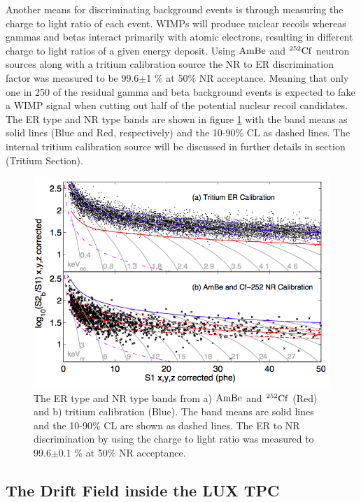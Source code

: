 Another means for discriminating background events is through measuring the charge to light ratio of each event. WIMPs will produce nuclear recoils whereas gammas and betas interact primarily with atomic electrons, resulting in different charge to light ratios of a given energy deposit. Using $\rm AmBe$ and $\rm ^{252}Cf$ neutron sources along with a tritium calibration source the NR to ER discrimination factor was measured to be 99.6$\pm$1 \% at 50\% NR acceptance. Meaning that only one in 250 of the residual gamma and beta background events is expected to fake a WIMP signal when cutting out half of the potential nuclear recoil candidates. The ER type and NR type bands are shown in figure \ref{fig:LUX_ER_NR_Band} with the band means as solid lines (Blue and Red, respectively) and the 10-90\% CL as dashed lines. The internal tritium calibration source will be discussed in further details in section (Tritium Section).

 \begin{figure}[h!]\centering
\includegraphics[scale=.5]{Chapter_LUX_Det/ER_NR_Band_Cal.png}
\caption{The ER type and NR type bands from a) $\rm AmBe$ and $\rm ^{252}Cf$ (Red)  and b) tritium calibration (Blue). The band means are solid lines and the 10-90\% CL are shown as dashed lines. The ER to NR discrimination by using the charge to light ratio was measured to 99.6$\pm$0.1 \% at 50\% NR acceptance.}
\label{fig:LUX_ER_NR_Band}
\end{figure}

\newpage

\subsection{The Drift Field inside the LUX TPC}

